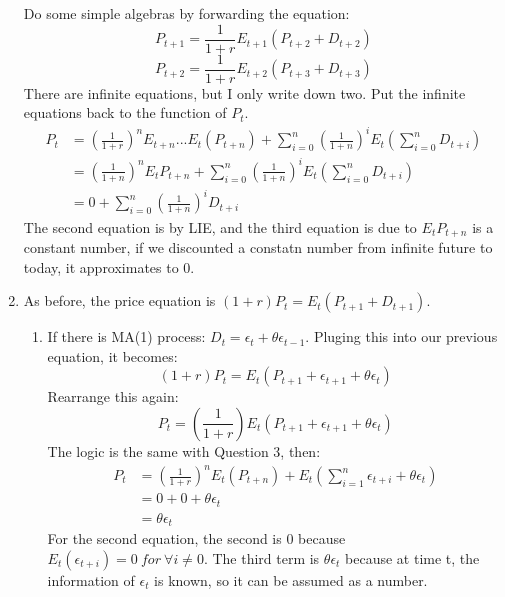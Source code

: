 \documentclass[11pt]{article} %
\begin{document}
\begin{enumerate}
        Do some simple algebras by forwarding the equation:
        \begin{equation}
            P_{t+1}=\frac{1}{1+r}E_{t+1}(P_{t+2}+D_{t+2})
        \end{equation}
        \begin{equation}
            P_{t+2}=\frac{1}{1+r}E_{t+2}(P_{t+3}+D_{t+3})
        \end{equation}
    There are infinite equations, but I only write down two. Put the infinite equations back to the function of $P_t$.
        \begin{align*}
            P_t&=(\frac{1}{1+r})^nE_{t+n}...E_t(P_{t+n})+\sum_{i=0}^n(\frac{1}{1+n})^iE_t(\sum_{i=0}^n D_{t+i})\\
            &=(\frac{1}{1+n})^nE_tP_{t+n}+\sum_{i=0}^n(\frac{1}{1+n})^iE_t(\sum_{i=0}^n D_{t+i})\\
            &=0+\sum_{i=0}^n (\frac{1}{1+n})^iD_{t+i}
        \end{align*}
    The second equation is by LIE, and the third equation is due to $E_t P_{t+n}$ is a constant number, if we discounted a constatn number from infinite future to today, it approximates to 0.
    \item As before, the price equation is $(1+r)P_t=E_t(P_{t+1}+D_{t+1})$.
        \begin{enumerate}
            \item If there is MA(1) process: $D_t=\epsilon_t+\theta\epsilon_{t-1}$. Pluging this into our previous equation, it becomes:
                \begin{equation}
                    (1+r)P_t=E_t(P_{t+1}+\epsilon_{t+1}+\theta\epsilon_t)
                \end{equation}
                Rearrange this again:
                \begin{equation}
                    P_t=(\frac{1}{1+r})E_t(P_{t+1}+\epsilon_{t+1}+\theta\epsilon_{t})
                \end{equation}
            The logic is the same with Question 3, then:
            \begin{align*}
                P_t&= (\frac{1}{1+r})^nE_t(P_{t+n})+E_t(\sum_{i=1}^n\epsilon_{t+i}+\theta\epsilon_t)\\
                    &=0+0+\theta\epsilon_t\\
                    &=\theta\epsilon_t
            \end{align*}
            For the second equation, the second is 0 because $E_t(\epsilon_{t+i})=0 \ for\  \forall i\neq 0$. The third term is $\theta \epsilon_t$ because at time t, the information of $\epsilon_t$ is known, so it can be assumed as a number. 
            

\end{enumerate}
\end{enumerate}
\end{document}
